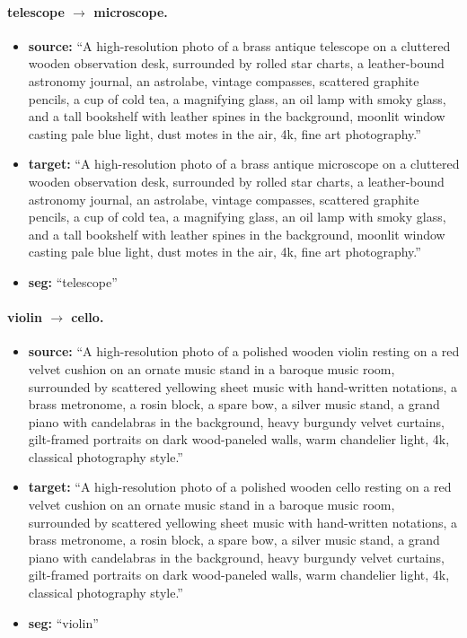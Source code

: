 \paragraph{telescope $\to$ microscope.}
\begin{itemize}
    \item \textbf{source:} ``A high-resolution photo of a brass antique telescope on a cluttered wooden observation desk, surrounded by rolled star charts, a leather-bound astronomy journal, an astrolabe, vintage compasses, scattered graphite pencils, a cup of cold tea, a magnifying glass, an oil lamp with smoky glass, and a tall bookshelf with leather spines in the background, moonlit window casting pale blue light, dust motes in the air, 4k, fine art photography.''
    \item \textbf{target:} ``A high-resolution photo of a brass antique microscope on a cluttered wooden observation desk, surrounded by rolled star charts, a leather-bound astronomy journal, an astrolabe, vintage compasses, scattered graphite pencils, a cup of cold tea, a magnifying glass, an oil lamp with smoky glass, and a tall bookshelf with leather spines in the background, moonlit window casting pale blue light, dust motes in the air, 4k, fine art photography.''
    \item \textbf{seg:} ``telescope''
\end{itemize}

\paragraph{violin $\to$ cello.}
\begin{itemize}
    \item \textbf{source:} ``A high-resolution photo of a polished wooden violin resting on a red velvet cushion on an ornate music stand in a baroque music room, surrounded by scattered yellowing sheet music with hand-written notations, a brass metronome, a rosin block, a spare bow, a silver music stand, a grand piano with candelabras in the background, heavy burgundy velvet curtains, gilt-framed portraits on dark wood-paneled walls, warm chandelier light, 4k, classical photography style.''
    \item \textbf{target:} ``A high-resolution photo of a polished wooden cello resting on a red velvet cushion on an ornate music stand in a baroque music room, surrounded by scattered yellowing sheet music with hand-written notations, a brass metronome, a rosin block, a spare bow, a silver music stand, a grand piano with candelabras in the background, heavy burgundy velvet curtains, gilt-framed portraits on dark wood-paneled walls, warm chandelier light, 4k, classical photography style.''
    \item \textbf{seg:} ``violin''
\end{itemize}

